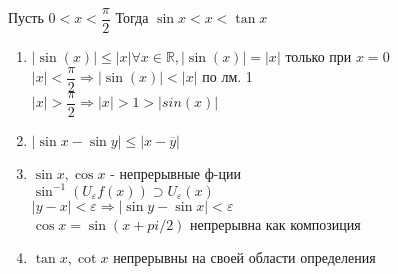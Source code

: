 \begin{lemma}
	Пусть $ 0 < x < \dfrac{\pi}{2} $ Тогда $ \sin x < x < \tan x $\\
\end{lemma}
\begin{consequence}
	\begin{enumerate}
	 \item 	$ |\sin(x) | \leq |x| \forall x \in \mathbb{R} , |\sin(x)| = | x| $ только при $x = 0$ \\
	 $ |x| < \dfrac{\pi}{2} \Rightarrow | \sin(x) | < |x| $ по лм. 1 \\
	 $ |x| > \dfrac{\pi}{2} \Rightarrow |x| > 1 > |sin(x)| $ 
	 \item $ |\sin x - \sin y | \leq | x - \overline{y} | $\\
	 \item $ \sin x, \cos x $ - непрерывные ф-ции\\
	 $ \sin^{-1} (U_{\varepsilon} f(x)) \supset U_{\varepsilon } (x) $\\
	 $ |y - x| < \varepsilon \Rightarrow |\sin y - \sin x| < \varepsilon $ \\
	 $ \cos x = \sin (x + pi / 2) $ непрерывна как композиция 
	 \item $ \tan x, \cot x $ непрерывны на своей области определения
	 
	\end{enumerate}

\end{consequence}

